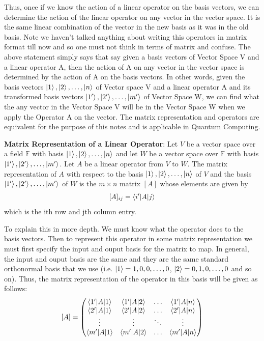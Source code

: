 Thus, once if we know the action of a linear operator on the basis vectors, we can determine the action of the linear operator on any vector in the vector space. It is the same linear combination
of the vector in the new basis as it was in the old basis. Note we haven't talked anything about writing this operators in matrix format till now and so one must not think in terms of matrix and confuse. 
The above statement simply says that say given a basis vectors of Vector Space V and a linear operator A, then the action of A on any vector in the vector space is determined by the action of A on the basis vectors.
In other words, given the basis vectors $\ket{1},\ket{2},\ldots,\ket{n}$ of Vector space V and a linear operator A and its transformed basis vectors $\ket{1'},\ket{2'},\ldots,\ket{m'}$ of Vector Space W, we can find what the any vector in the 
Vector Space V will be in the Vector Space W when we apply the Operator A on the vector. 
The matrix representation and operators are equivalent for the purpose of this notes and is applicable in 
Quantum Computing.

\begin{definition}
    \textbf{Matrix Representation of a Linear Operator}: Let $V$ be a vector space over a field 
    $\mathbb{F}$ with basis $\ket{1},\ket{2},\ldots,\ket{n}$ and let $W$ be a vector 
    space over $\mathbb{F}$ with basis $\ket{1'},\ket{2'},\ldots,\ket{m'}$. Let $A$ be 
    a linear operator from $V$ to $W$. The matrix representation of $A$ with respect to 
    the basis $\ket{1},\ket{2},\ldots,\ket{n}$ of $V$ and the basis $\ket{1'},\ket{2'},
    \ldots,\ket{m'}$ of $W$ is the $m\times n$ matrix $[A]$ whose elements are given by
    \[[A]_{ij}=\braket{i'|A|j}\]
    which is the ith row and jth column entry.
\end{definition}

To explain this in more depth. We must know what the operator does to the basis vectors. Then
to represent this operator in some matrix representation we must first specify the input and ouput basis
for the matrix to map. In general, the input and ouput basis are the same and they are the same standard orthonormal
basis that we use (i.e. $\ket{1}=1,0,0,\ldots,0$, $\ket{2}=0,1,0,\ldots,0$ and so on). 
Thus, the matrix representation of the operator in this basis will be given as follows:
\[ [A]=\begin{pmatrix} \braket{1'|A|1} & \braket{1'|A|2} & \ldots & \braket{1'|A|n} \\ \braket{2'|A|1} & \braket{2'|A|2} & \ldots & \braket{2'|A|n} \\ \vdots & \vdots & \ddots & \vdots \\ \braket{m'|A|1} & \braket{m'|A|2} & \ldots & \braket{m'|A|n} \end{pmatrix} \]

